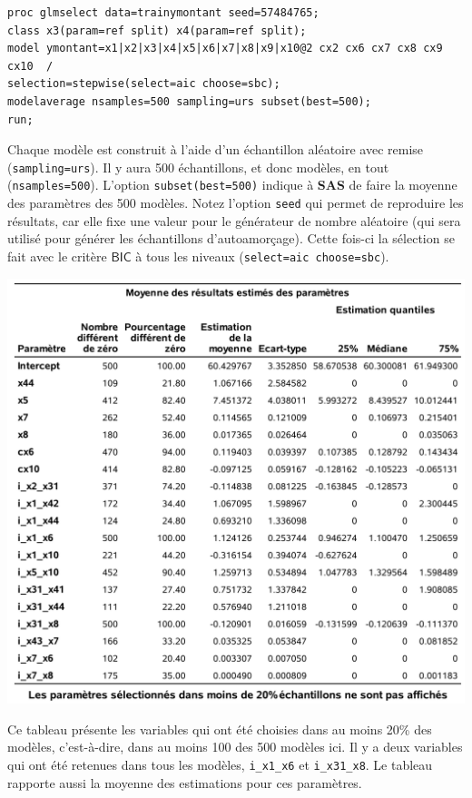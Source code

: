 \documentclass[
  11pt,
  letterpaper,
]{book}
\theoremstyle{definition}
\theoremstyle{definition}
\theoremstyle{definition}
\theoremstyle{remark}
\begin{document}
\begin{verbatim}
proc glmselect data=trainymontant seed=57484765;
class x3(param=ref split) x4(param=ref split);
model ymontant=x1|x2|x3|x4|x5|x6|x7|x8|x9|x10@2 cx2 cx6 cx7 cx8 cx9 cx10  /   
selection=stepwise(select=aic choose=sbc); 
modelaverage nsamples=500 sampling=urs subset(best=500);
run;
\end{verbatim}

Chaque modèle est construit à l'aide d'un échantillon aléatoire avec remise (\texttt{sampling=urs}). Il y aura 500 échantillons, et donc modèles, en tout (\texttt{nsamples=500}). L'option \texttt{subset(best=500)} indique à \textbf{SAS} de faire la moyenne des paramètres des 500 modèles. Notez l'option \texttt{seed} qui permet de reproduire les résultats, car elle fixe une valeur pour le générateur de nombre aléatoire (qui sera utilisé pour générer les échantillons d'autoamorçage). Cette fois-ci la sélection se fait avec le critère \(\mathsf{BIC}\) à tous les niveaux (\texttt{select=aic\ choose=sbc}).

\begin{center}\includegraphics[width=0.9\linewidth]{figures/02-select-e16} \end{center}

Ce tableau présente les variables qui ont été choisies dans au moins 20\% des modèles, c'est-à-dire, dans au moins 100 des 500 modèles ici. Il y a deux variables qui ont été retenues dans tous les modèles, \texttt{i\_x1\_x6} et \texttt{i\_x31\_x8}. Le tableau rapporte aussi la moyenne des estimations pour ces paramètres.
\end{document}

